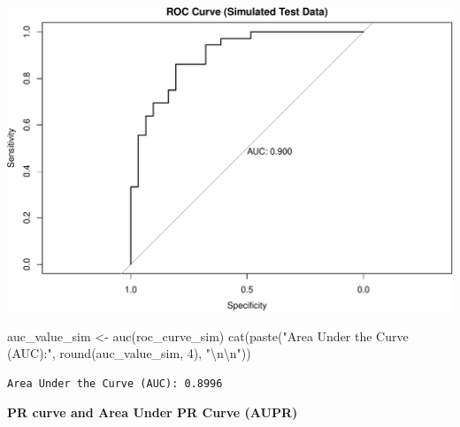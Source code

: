 \documentclass[
  letterpaper,
]{scrbook}
\newenvironment{Shaded}{\begin{snugshade}}{\end{snugshade}}
\newcommand{\DecValTok}[1]{\textcolor[rgb]{0.68,0.00,0.00}{#1}}
\newcommand{\FunctionTok}[1]{\textcolor[rgb]{0.28,0.35,0.67}{#1}}
\newcommand{\NormalTok}[1]{\textcolor[rgb]{0.00,0.23,0.31}{#1}}
\newcommand{\OtherTok}[1]{\textcolor[rgb]{0.00,0.23,0.31}{#1}}
\newcommand{\SpecialCharTok}[1]{\textcolor[rgb]{0.37,0.37,0.37}{#1}}
\newcommand{\StringTok}[1]{\textcolor[rgb]{0.13,0.47,0.30}{#1}}
\begin{document}
\includegraphics{unit4-lr/logistic_files/figure-pdf/unnamed-chunk-8-1.pdf}

\begin{Shaded}
\begin{Highlighting}[]
\NormalTok{auc\_value\_sim }\OtherTok{\textless{}{-}} \FunctionTok{auc}\NormalTok{(roc\_curve\_sim)}
\FunctionTok{cat}\NormalTok{(}\FunctionTok{paste}\NormalTok{(}\StringTok{"Area Under the Curve (AUC):"}\NormalTok{, }\FunctionTok{round}\NormalTok{(auc\_value\_sim, }\DecValTok{4}\NormalTok{), }\StringTok{"}\SpecialCharTok{\textbackslash{}n\textbackslash{}n}\StringTok{"}\NormalTok{))}
\end{Highlighting}
\end{Shaded}

\begin{verbatim}
Area Under the Curve (AUC): 0.8996 
\end{verbatim}

\textbf{PR curve and Area Under PR Curve (AUPR)}
\end{document}
